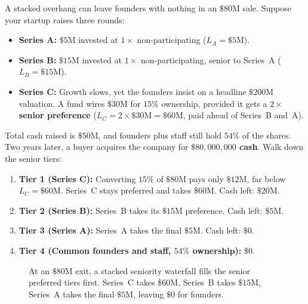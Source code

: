 A stacked overhang can leave founders with nothing in an $\$80\text{M}$ sale. Suppose your startup raises three rounds:
\begin{itemize}
  \item \textbf{Series A:} $\$5\text{M}$ invested at $1\times$ non-participating ($L_A = \$5\text{M}$).
  \item \textbf{Series B:} $\$15\text{M}$ invested at $1\times$ non-participating, senior to Series~A ($L_B = \$15\text{M}$).
  \item \textbf{Series C:} Growth slows, yet the founders insist on a headline $\$200\text{M}$ valuation. A fund wires $\$30\text{M}$ for $15\%$ ownership, provided it gets a \textbf{$2\times$ senior preference} ($L_C = 2 \times \$30\text{M} = \$60\text{M}$, paid ahead of Series~B and~A).
\end{itemize}

Total cash raised is $\$50\text{M}$, and founders plus staff still hold $54\%$ of the shares. Two years later, a buyer acquires the company for \textbf{$\$80{,}000{,}000$ cash}. Walk down the senior tiers:
\begin{enumerate}
  \item \textbf{Tier 1 (Series C):} Converting $15\%$ of $\$80\text{M}$ pays only $\$12\text{M}$, far below $L_C = \$60\text{M}$. Series~C stays preferred and takes \textbf{$\$60\text{M}$}. Cash left: $\$20\text{M}$.
  \item \textbf{Tier 2 (Series B):} Series~B takes its \textbf{$\$15\text{M}$} preference. Cash left: $\$5\text{M}$.
  \item \textbf{Tier 3 (Series A):} Series~A takes the final \textbf{$\$5\text{M}$}. Cash left: \textbf{$\$0$}.
  \item \textbf{Tier 4 (Common founders and staff, $54\%$ ownership):} \textbf{$\$0$}.
\end{enumerate}

\begin{figure}[htbp]
\centering
{}
\caption{At an $\$80\text{M}$ exit, a stacked seniority waterfall fills the senior preferred tiers first. Series~C takes $\$60\text{M}$, Series~B takes $\$15\text{M}$, Series~A takes the final $\$5\text{M}$, leaving $\$0$ for founders.}
\label{fig:stacked-waterfall-bar}
\end{figure}


